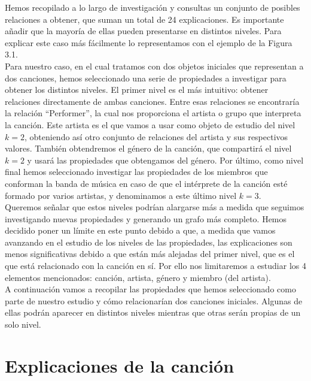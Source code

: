 Hemos recopilado a lo largo de investigación y consultas un conjunto de posibles relaciones a obtener, que suman un total de 24 explicaciones. Es importante añadir que la mayoría de ellas pueden presentarse en distintos niveles. Para explicar este caso más fácilmente lo representamos con el ejemplo de la Figura 3.1.\\

Para nuestro caso, en el cual tratamos con dos objetos iniciales que representan a dos canciones, hemos seleccionado una serie de propiedades a investigar para obtener los distintos niveles. El primer nivel es el más intuitivo: obtener relaciones directamente de ambas canciones. Entre esas relaciones se encontraría la relación ``Performer'', la cual nos proporciona el artista o grupo que interpreta la canción. Este artista es el que vamos a usar como objeto de estudio del nivel $k = 2$, obteniendo así otro conjunto de relaciones del artista y sus respectivos valores. También obtendremos el género de la canción, que compartirá el nivel $k = 2$ y usará las propiedades que obtengamos del género. Por último, como nivel final hemos seleccionado investigar las propiedades de los miembros que conforman la banda de música en caso de que el intérprete de la canción esté formado por varios artistas, y denominamos a este último nivel $k= 3$.\\

Queremos señalar que estos niveles podrían alargarse más a medida que seguimos investigando nuevas propiedades y generando un grafo más completo. Hemos decidido poner un límite en este punto debido a que, a medida que vamos avanzando en el estudio de los niveles de las propiedades, las explicaciones son menos significativas debido a que están más alejadas del primer nivel, que es el que está relacionado con la canción en sí. Por ello nos limitaremos a estudiar los 4 elementos mencionados: canción, artista, género y miembro (del artista).\\

A continuación vamos a recopilar las propiedades que hemos seleccionado como parte de nuestro estudio y cómo relacionarían dos canciones iniciales. Algunas de ellas podrán aparecer en distintos niveles mientras que otras serán propias de un solo nivel.\\

\section{Explicaciones de la canción}

